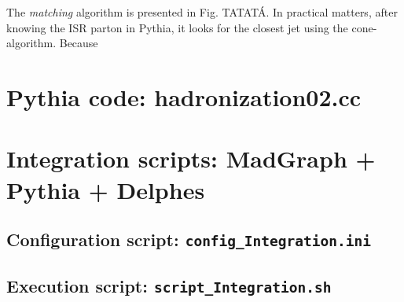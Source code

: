 \documentclass[12pt, oneside]{book}              %
\begin{document}
The \textit{matching} algorithm is presented in Fig. TATATÁ. In practical 
matters, after knowing the ISR parton in Pythia, it looks for the
closest jet using the cone-algorithm. Because  


\begin{appendices}
\chapter[Pythia code]{Pythia code: hadronization02.cc}\label{App:hadronization02.cc}


\chapter[Integration scripts]{Integration scripts: MadGraph + Pythia + Delphes}\label{App:scripts}
\section{Configuration script: \texttt{config\_Integration.ini}}\label{sec:Configuration_script}

\section{Execution script: \texttt{script\_Integration.sh}}\label{sec:Execution_script}

\end{appendices}




	
\end{document}
